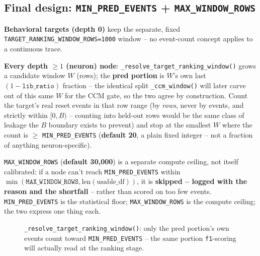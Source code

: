 \documentclass[11pt]{article}
\begin{document}
\subsection{Final design: \texttt{MIN\_PRED\_EVENTS} + \texttt{MAX\_WINDOW\_ROWS}}
\label{sec:window-sizing-final}
\begin{steps}
\item \textbf{Behavioral targets (depth 0)} keep the separate, fixed \texttt{TARGET\_RANKING\_WINDOW\_ROWS=1000} window -- no event-count concept applies to a continuous trace.
\item \textbf{Every depth $\ge 1$ (neuron) node}: \texttt{\_resolve\_target\_ranking\_window()} grows a candidate window $W$ (rows); the \textbf{pred portion} is $W$'s own last $(1{-}\texttt{lib\_ratio})$ fraction -- the identical split \texttt{\_ccm\_window()} will later carve out of this same $W$ for the CCM gate, so the two agree by construction. Count the target's real reset events in that row range (by \emph{rows}, never by events, and strictly within $[0,B)$ -- counting into held-out rows would be the same class of leakage the $B$ boundary exists to prevent) and stop at the smallest $W$ where the count is $\ge$ \texttt{MIN\_PRED\_EVENTS} (\textbf{default 20}, a plain fixed integer -- not a fraction of anything neuron-specific).
\item \texttt{MAX\_WINDOW\_ROWS} (\textbf{default 30{,}000}) is a separate compute ceiling, not itself calibrated: if a node can't reach \texttt{MIN\_PRED\_EVENTS} within $\min(\texttt{MAX\_WINDOW\_ROWS}, \mathrm{len(usable\_df)})$, it is \textbf{skipped -- logged with the reason and the shortfall} -- rather than scored on too few events. \texttt{MIN\_PRED\_EVENTS} is the statistical floor; \texttt{MAX\_WINDOW\_ROWS} is the compute ceiling; the two express one thing each.
\end{steps}

\begin{figure}[h]
\centering
{}
\caption{\texttt{\_resolve\_target\_ranking\_window()}: only the pred portion's own events count toward \texttt{MIN\_PRED\_EVENTS} -- the same portion \texttt{f1}-scoring will actually read at the ranking stage.}
\label{fig:window-growth}
\end{figure}
\end{document}
